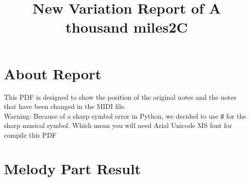 \documentclass{article}
\title{New Variation Report of A thousand miles2C}
\begin{document}
\maketitle
\section*{About Report}
This PDF is designed to show the position of the original notes and the notes that have been changed in the MIDI file. \\
Warning: Because of a sharp symbol error in Python, we decided to use ♯ for the sharp musical symbol. Which mean you will need Arial Unicode MS font for compile this PDF
\section*{Melody Part Result}
\end{document}
